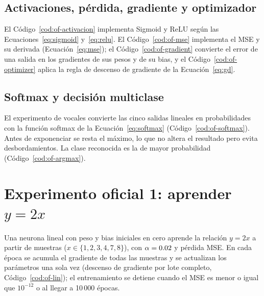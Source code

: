 \subsection{Activaciones, pérdida, gradiente y optimizador}
El Código~\ref{cod:of-activacion} implementa Sigmoid y ReLU según las Ecuaciones~\eqref{eq:sigmoid} y~\eqref{eq:relu}. El Código~\ref{cod:of-mse} implementa el MSE y su derivada (Ecuación~\eqref{eq:mse}); el Código~\ref{cod:of-gradient} convierte el error de una salida en los gradientes de sus pesos y de su bias, y el Código~\ref{cod:of-optimizer} aplica la regla de descenso de gradiente de la Ecuación~\eqref{eq:gd}.





\subsection{Softmax y decisión multiclase}
El experimento de vocales convierte las cinco salidas lineales en probabilidades con la función softmax de la Ecuación~\eqref{eq:softmax} (Código~\ref{cod:of-softmax}). Antes de exponenciar se resta el máximo, lo que no altera el resultado pero evita desbordamientos. La clase reconocida es la de mayor probabilidad (Código~\ref{cod:of-argmax}).




\section{Experimento oficial 1: aprender $y=2x$}\label{sec:of-lineal}
Una neurona lineal con peso y bias iniciales en cero aprende la relación $y=2x$ a partir de \OfLinN{} muestras ($x\in\{1,2,3,4,7,8\}$), con $\alpha=0.02$ y pérdida MSE. En cada época se acumula el gradiente de todas las muestras y se actualizan los parámetros una sola vez (descenso de gradiente por lote completo, Código~\ref{cod:of-lin}); el entrenamiento se detiene cuando el MSE es menor o igual que $10^{-12}$ o al llegar a 10\,000 épocas.

